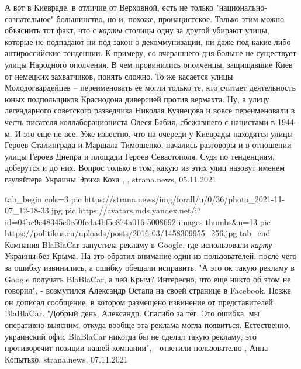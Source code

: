 А вот в Киевраде, в отличие от Верховной, есть не только
"национально-сознательное" большинство, но и, похоже, пронацистское. Только
этим можно объяснить тот факт, что с \emph{карты} столицы одну за другой
убирают улицы, которые не подпадают ни под закон о декоммунизации, ни даже под
какие-либо антироссийские тенденции.  К примеру, со вчерашнего дня больше не
существует улицы Народного ополчения. В чем провинились ополченцы, защищавшие
Киев от немецких захватчиков, понять сложно.  То же касается улицы
Молодогвардейцев – переименовать ее могли только те, кто считает деятельность
юных подпольщиков Краснодона диверсией против вермахта.  Ну, а улицу
легендарного советского разведчика Николая Кузнецова и вовсе переименовали в
честь писателя-коллаборациониста Олеся Бабия, сбежавшего с нацистами в 1944-м.
И это еще не все. Уже известно, что на очереди у Киеврады находятся улицы
Героев Сталинграда и Маршала Тимошенко, начались разговоры и в отношении улицы
Героев Днепра и площади Героев Севастополя. Судя по тенденциям, доберутся и до
них. Вопрос только в том, какую из этих улиц назовут именем гауляйтера Украины
Эриха Коха
, 
, strana.news, 05.11.2021

\ifcmt

\ifcmt
  tab_begin cols=3
    pic https://strana.news/img/forall/u/0/36/photo_2021-11-07_12-18-33.jpg
    pic https://avatars.mds.yandex.net/i?id=04bc9e48345c0e50fcda4bf5e874a016-5008692-images-thumbs&n=13
    pic https://politikus.ru/uploads/posts/2016-03/1458309955_256.jpg
  tab_end
\fi
Компания BlaBlaCar запустила рекламу в Google, где использовали \emph{карту} Украины
без Крыма. На это обратил внимание один из пользователей, после чего за ошибку
извинились, а ошибку обещали исправить.  "А это ок такую рекламу в Google
получать BlaBlaCar, а чей Крым? Интересно, что еще никто об этом не говорил", -
возмутился Александр Остапа на своей странице в Facebook.  Позже он дописал
сообщение, в котором размещено извинение от представителей BlaBlaCar.  "Добрый
день, Александр. Спасибо за тег. Это ошибка, мы оперативно выясним, откуда
вообще эта реклама могла появиться. Естественно, украинский офис BlaBlaCar
никогда бы не сделал такую рекламу, это противоречит позиции нашей компании", -
ответили пользователю
, 
Анна Копытько, strana.news, 07.11.2021

